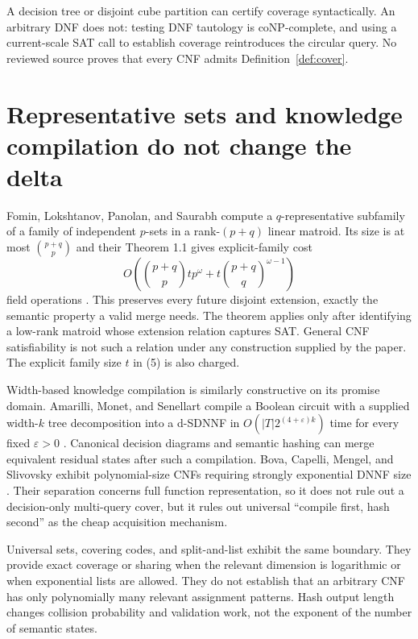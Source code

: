 \documentclass[11pt]{article}
\begin{document}
A decision tree or disjoint cube partition can certify coverage
syntactically.  An arbitrary DNF does not: testing DNF tautology is
coNP-complete, and using a current-scale SAT call to establish coverage
reintroduces the circular query.  No reviewed source proves that every CNF
admits Definition~\ref{def:cover}.

\section{Representative sets and knowledge compilation do not change the delta}

Fomin, Lokshtanov, Panolan, and Saurabh compute a $q$-representative
subfamily of a family of independent $p$-sets in a rank-$(p+q)$ linear
matroid.  Its size is at most $\binom{p+q}{p}$ and their Theorem 1.1 gives
explicit-family cost
\[
 O\!\left(\binom{p+q}{p}t p^\omega
       +t\binom{p+q}{q}^{\omega-1}\right)
\]
field operations \cite{fominrepresentative2016}.  This preserves every
future disjoint extension, exactly the semantic property a valid merge
needs.  The theorem applies only after identifying a low-rank matroid whose
extension relation captures SAT.  General CNF satisfiability is not such a
relation under any construction supplied by the paper.  The explicit
family size $t$ in (5) is also charged.

Width-based knowledge compilation is similarly constructive on its promise
domain.  Amarilli, Monet, and Senellart compile a Boolean circuit with a
supplied width-$k$ tree decomposition into a d-SDNNF in
$O(|T|2^{(4+\varepsilon)k})$ time for every fixed
$\varepsilon>0$ \cite{amarillimonetsenellart2018}.  Canonical decision
diagrams and semantic hashing can merge equivalent residual states after
such a compilation.  Bova, Capelli, Mengel, and Slivovsky exhibit
polynomial-size CNFs requiring strongly exponential DNNF size
\cite{bovaetal2016}.  Their separation concerns full function
representation, so it does not rule out a decision-only multi-query cover,
but it rules out universal ``compile first, hash second'' as the cheap
acquisition mechanism.

Universal sets, covering codes, and split-and-list exhibit the same
boundary.  They provide exact coverage or sharing when the relevant
dimension is logarithmic or when exponential lists are allowed.  They do
not establish that an arbitrary CNF has only polynomially many relevant
assignment patterns.  Hash output length changes collision probability and
validation work, not the exponent of the number of semantic states.
\end{document}
